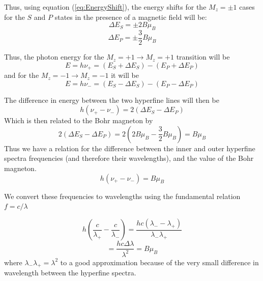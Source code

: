 \documentclass[twocolumn]{article}
\begin{document}
			Thus, using equation (\ref{eq:EnergyShift}), the energy shifts for the $M_z = \pm1$ cases for the $S$ and $P$ states in the presence of a magnetic field will be:
			\begin{equation}
				\Delta E_S = \pm 2B\mu_B
			\end{equation}
			\begin{equation}
				\Delta E_P = \pm \frac{3}{2}B\mu_B
			\end{equation}
			
			Thus, the photon energy for the $M_z = +1 \rightarrow M_z = +1$ transition will be
			\begin{equation}
				E = h\nu_+ = (E_S + \Delta E_S) - (E_P + \Delta E_P)
			\end{equation}
			and for the $M_z = -1 \rightarrow M_z = -1$ it will be
			\begin{equation}
				E = h\nu_- = (E_S - \Delta E_S) - (E_P - \Delta E_P)
			\end{equation}
			
			The difference in energy between the two hyperfine lines will then be
			\begin{equation}
				h(\nu_+ - \nu_-) = 2(\Delta E_S - \Delta E_P)
			\end{equation}
			Which is then related to the Bohr magneton by
			\begin{equation}
				2(\Delta E_S - \Delta E_P) = 2\left( 2B\mu_B - \frac{3}{2}B \mu_B \right) = B \mu_B
			\end{equation}
			Thus we have a relation for the difference between the inner and outer hyperfine spectra frequencies (and therefore their wavelengths), and the value of the Bohr magneton.
			\begin{equation}
				h(\nu_+ - \nu_-) = B\mu_B
			\end{equation}
			
			We convert these frequencies to wavelengths using the fundamental relation $f = c/\lambda$
			
			\begin{equation}
				h \left( \frac{c}{\lambda_+} - \frac{c}{\lambda_-} \right) = \frac{hc \left(\lambda_- - \lambda_+ \right)}{\lambda_- \lambda_+}
			\end{equation}
			\begin{equation}
				= \frac{hc\Delta\lambda}{\lambda^2} = B\mu_B
			\end{equation}
			where $\lambda_-\lambda_+ = \lambda^2$ to a good approximation because of the very small difference in wavelength between the hyperfine spectra.
			
\end{document}
